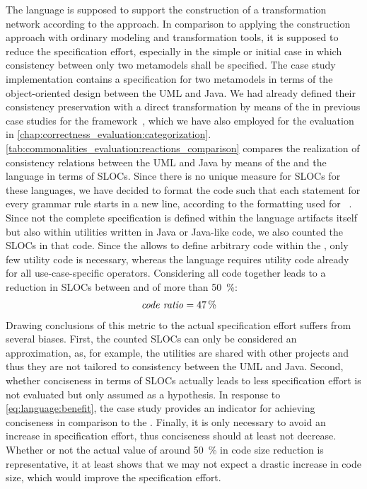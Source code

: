 The \commonalities language is supposed to support the construction of a transformation network according to the \commonalities approach.
In comparison to applying the construction approach with ordinary modeling and transformation tools, it is supposed to reduce the specification effort, especially in the simple or initial case in which consistency between only two metamodels shall be specified.
The case study implementation contains a specification for two metamodels in terms of the object-oriented design \commonalities between the \gls{UML} and Java.
We had already defined their consistency preservation with a direct transformation by means of the \reactionslanguage in previous case studies for the \vitruv framework~, which we have also employed for the evaluation in \autoref{chap:correctness_evaluation:categorization}.
\autoref{tab:commonalities_evaluation:reactions_comparison} compares the realization of consistency relations between the \gls{UML} and Java by means of the \reactionslanguage and the \commonalities language in terms of \glspl{SLOC}.
Since there is no unique measure for \glspl{SLOC} for these languages, we have decided to format the code such that each statement for every grammar rule starts in a new line, according to the formatting used for \reactions~.
Since not the complete specification is defined within the language artifacts itself but also within utilities written in Java or Java-like code, we also counted the \glspl{SLOC} in that code.
Since the \reactionslanguage allows to define arbitrary code within the \reactions, only few utility code is necessary, whereas the \commonalities language requires utility code already for all use-case-specific operators.
Considering all code together leads to a reduction in \glspl{SLOC} between \reactions and \commonalities of more than \SI{50}{\percent}:
\begin{align*}
    &
    \mathit{code\ ratio} = \SI{47}{\percent}
\end{align*}
Drawing conclusions of this metric to the actual specification effort suffers from several biases.
First, the counted \glspl{SLOC} can only be considered an approximation, as, for example, the utilities are shared with other projects and thus they are not tailored to consistency between the \gls{UML} and Java.
Second, whether conciseness in terms of \glspl{SLOC} actually leads to less specification effort is not evaluated but only assumed as a hypothesis.
In response to \autoref{eq:language:benefit}, the case study provides an indicator for achieving conciseness in comparison to the \reactionslanguage.
Finally, it is only necessary to avoid an increase in specification effort, thus conciseness should at least not decrease.
Whether or not the actual value of around \SI{50}{\percent} in code size reduction is representative, it at least shows that we may not expect a drastic increase in code size, which would improve the specification effort.



